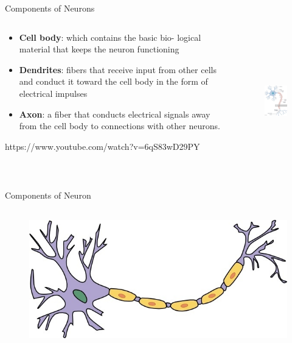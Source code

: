 \documentclass{beamer} %
\begin{document}
\begin{frame}{Components of Neurons}
\begin{columns}
\begin{column}{0.5\textwidth}
\begin{itemize}
    \item \textbf{Cell body}: which contains the basic bio- logical material that keeps the neuron functioning
    \item \textbf{Dendrites}: fibers that receive input from other cells and conduct it toward the cell body in the form of electrical impulses
    \item \textbf{Axon}: a fiber that conducts electrical signals away from the cell body to connections with other neurons.
\end{itemize}
https://www.youtube.com/watch?v=6qS83wD29PY
\end{column}
\begin{column}{0.45\textwidth}
\begin{figure}
    \includegraphics[width=\textwidth,height = 6cm]{531825569-1024x1024.jpg}
\end{figure}
\end{column}
\end{columns}
\end{frame}
\begin{frame}{Components of Neuron}
\begin{figure}
    \includegraphics[width=\textwidth,height = 6cm]{neuron_with_axon_clip_art_23340.jpg}
\end{figure}
\end{frame}
\end{document}
